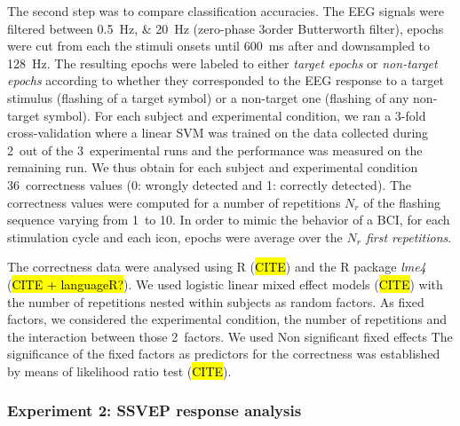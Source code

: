 \documentclass[10pt]{article}
\begin{document}
        The second step was to compare classification accuracies.
        The \ac{EEG} signals were filtered between \SIlist[list-units = single]{0.5;20}{\Hz} (zero-phase 3\rd order Butterworth filter), epochs were cut from each the stimuli onsets until \SI{600}{\ms} after and downsampled to \SI{128}{\Hz}.
        The resulting epochs were labeled to either \emph{target epochs} or \emph{non-target epochs} according to whether they corresponded to the \ac{EEG} response to a target stimulus (flashing of a target symbol) or a non-target one (flashing of any non-target symbol).
        For each subject and experimental condition, we ran a 3-fold cross-validation where a linear \ac{SVM} was trained \parencite{Keerthi2006} on the data collected during 2~out of the 3~experimental runs and the performance was measured on the remaining run.
        We thus obtain for each subject and experimental condition 36~correctness values (0: wrongly detected and 1: correctly detected).
        The correctness values were computed for a number of repetitions $N_r$ of the flashing sequence varying from 1~to 10.
        In order to mimic the behavior of a \ac{BCI}, for each stimulation cycle and each icon, epochs were average over the \emph{$N_r$ first repetitions}.

        The correctness data were analysed using R (\hl{CITE}) and the R package \emph{lme4} (\hl{CITE + languageR?}).
        We used logistic linear mixed effect models (\hl{CITE}) with the number of repetitions nested within subjects as random factors.
        As fixed factors, we considered the experimental condition, the number of repetitions and the interaction between those 2~factors.
        We used
        Non significant fixed effects
        The significance of the fixed factors as predictors for the correctness was established by means of likelihood ratio test (\hl{CITE}).


        \subsubsection{Experiment 2: SSVEP response analysis}
        \label{sec:2.3.2AnalysisExp2}

\end{document}
